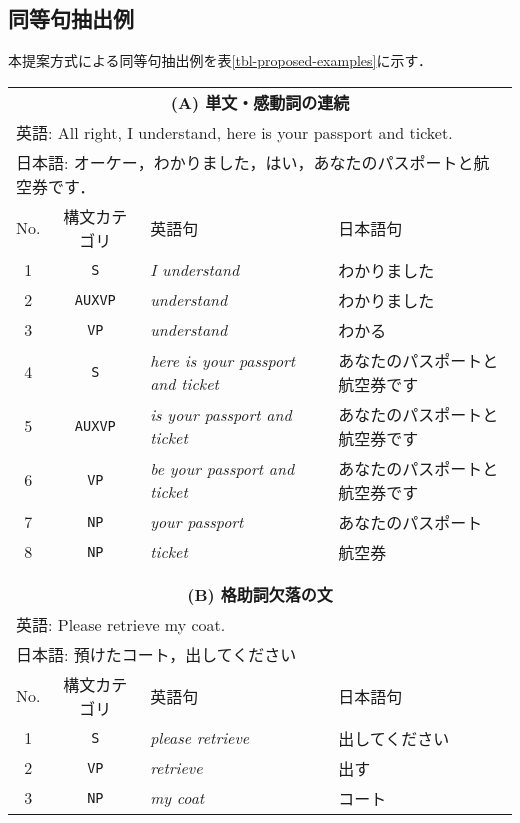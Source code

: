 \subsection{同等句抽出例}

本提案方式による同等句抽出例を表\ref{tbl-proposed-examples}に示す．

\begin{table*}
\begin{center}
\caption{提案方式の句アライメント結果}
\label{tbl-proposed-examples}
{\smalltable 
\begin{tabular}{c|c|ll}
\multicolumn{4}{c}{\bf (A) 単文・感動詞の連続} \\
\multicolumn{4}{l}{英語: All right, I understand, here is your passport and ticket.} \\
\multicolumn{4}{l}{日本語: オーケー，わかりました，はい，あなたのパスポートと航空券です．} \\
\hline\hline
No. & 構文カテゴリ & 英語句 & 日本語句 \\
\hline
1 & {\tt S}     & {\em I understand} & {わかりました} \\
2 & {\tt AUXVP} & {\em understand} & {わかりました} \\
3 & {\tt VP}    & {\em understand} & {わかる} \\
4 & {\tt S}     & {\em here is your passport and ticket}
	    & {あなたのパスポートと航空券です} \\
5 & {\tt AUXVP} & {\em is your passport and ticket} 
	    & {あなたのパスポートと航空券です} \\
6 & {\tt VP}    & {\em be your passport and ticket} 
	    & {あなたのパスポートと航空券です} \\
7 & {\tt NP}    & {\em your passport} & {あなたのパスポート} \\
8 & {\tt NP}    & {\em ticket} & {航空券} \\
\hline\hline
\multicolumn{4}{c}{} \\
\multicolumn{4}{c}{} \\
\multicolumn{4}{c}{\bf (B) 格助詞欠落の文} \\
\multicolumn{4}{l}{英語: Please retrieve my coat.} \\
\multicolumn{4}{l}{日本語: 預けたコート，出してください} \\
\hline\hline
No. & 構文カテゴリ & 英語句 & 日本語句 \\
\hline
1 & {\tt S}     & {\em please retrieve} & {出してください} \\
2 & {\tt VP}    & {\em retrieve} & {出す} \\
3 & {\tt NP}    & {\em my coat} & {コート} \\
\hline\hline
\end{tabular}
}
\end{center}
\end{table*}

